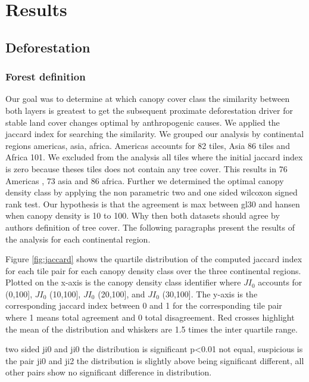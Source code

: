 \chapter{Results}
\label{ch:result}

	\section{Deforestation}
	\label{sec:deforestation}

		\subsection{Forest definition}
		\label{subsec:forest_definition}
			 Our goal was to determine at which canopy cover class the similarity between both layers is greatest to get the subsequent proximate deforestation driver for stable land cover changes optimal by anthropogenic causes. We applied the jaccard index for searching the similarity. We grouped our analysis by continental regions americas, asia, africa. Americas accounts for 82 tiles, Asia 86 tiles and Africa 101. We excluded from the analysis all tiles where the initial jaccard index is zero because theses tiles does not contain any tree cover. This results in 76 Americas , 73 asia and 86 africa. Further we determined the optimal canopy density class by applying the non parametric two and one sided wilcoxon signed rank test. Our hypothesis is that the agreement is max between gl30 and hansen when canopy density is 10 to 100. Why then both datasets should agree by authors definition of tree cover. The following paragraphs present the results of the analysis for each continental region. 

			 Figure \ref{fig:jaccard} shows the quartile distribution of the computed jaccard index for each tile pair for each canopy density class over the three continental regions. Plotted on the x-axis is the canopy density class identifier where $JI_0$ accounts for (0,100], $JI_0$ (10,100], $JI_0$ (20,100], and $JI_0$ (30,100]. The y-axis is the corresponding jaccard index between 0 and 1 for the corresponding tile pair where 1 means total agreement and 0 total disagreement. Red crosses highlight the mean of the distribution and whiskers are 1.5 times the inter quartile range. 
 
			two sided ji0 and ji0 the distribution is significant p<0.01 not equal, suspicious is the pair ji0 and ji2 the distribution is slightly above being significant different, all other pairs show no significant difference in distribution. 

